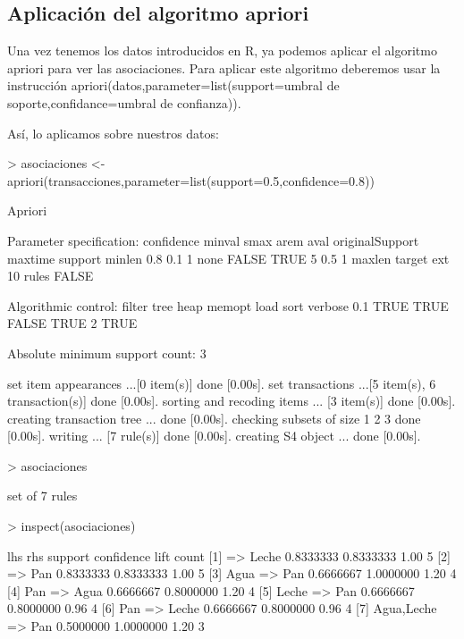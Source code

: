 \documentclass [a4paper] {article}
\begin{document}
\subsection{Aplicación del algoritmo apriori}
Una vez tenemos los datos introducidos en R, ya podemos aplicar el algoritmo apriori para ver las asociaciones. Para aplicar este algoritmo deberemos 
usar la instrucción apriori(datos,parameter=list(support=umbral de soporte,confidance=umbral de confianza)).

Así, lo aplicamos sobre nuestros datos:
\begin{Schunk}
\begin{Sinput}
> asociaciones <- apriori(transacciones,parameter=list(support=0.5,confidence=0.8))
\end{Sinput}
\begin{Soutput}
Apriori

Parameter specification:
 confidence minval smax arem  aval originalSupport maxtime support minlen
        0.8    0.1    1 none FALSE            TRUE       5     0.5      1
 maxlen target   ext
     10  rules FALSE

Algorithmic control:
 filter tree heap memopt load sort verbose
    0.1 TRUE TRUE  FALSE TRUE    2    TRUE

Absolute minimum support count: 3 

set item appearances ...[0 item(s)] done [0.00s].
set transactions ...[5 item(s), 6 transaction(s)] done [0.00s].
sorting and recoding items ... [3 item(s)] done [0.00s].
creating transaction tree ... done [0.00s].
checking subsets of size 1 2 3 done [0.00s].
writing ... [7 rule(s)] done [0.00s].
creating S4 object  ... done [0.00s].
\end{Soutput}
\begin{Sinput}
> asociaciones
\end{Sinput}
\begin{Soutput}
set of 7 rules 
\end{Soutput}
\begin{Sinput}
> inspect(asociaciones)
\end{Sinput}
\begin{Soutput}
    lhs             rhs     support   confidence lift count
[1] {}           => {Leche} 0.8333333 0.8333333  1.00 5    
[2] {}           => {Pan}   0.8333333 0.8333333  1.00 5    
[3] {Agua}       => {Pan}   0.6666667 1.0000000  1.20 4    
[4] {Pan}        => {Agua}  0.6666667 0.8000000  1.20 4    
[5] {Leche}      => {Pan}   0.6666667 0.8000000  0.96 4    
[6] {Pan}        => {Leche} 0.6666667 0.8000000  0.96 4    
[7] {Agua,Leche} => {Pan}   0.5000000 1.0000000  1.20 3    
\end{Soutput}
\end{Schunk}
\end{document}
